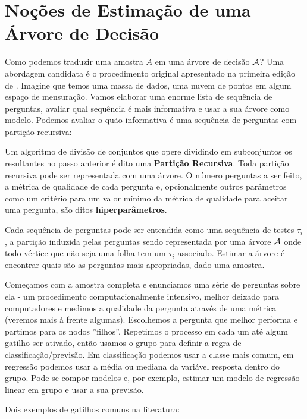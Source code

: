 \section{Noções de Estimação de uma Árvore de Decisão}

Como podemos traduzir uma amostra $A$ em uma árvore de decisão $\mathcal{A}$? Uma abordagem candidata é o procedimento original apresentado na primeira edição de . Imagine que temos uma massa de dados, uma nuvem de pontos em algum espaço de mensuração. Vamos elaborar uma enorme lista de sequência de perguntas, avaliar qual sequência é mais informativa e usar a sua árvore como modelo. Podemos avaliar o quão informativa é uma sequência de perguntas com partição recursiva:

\begin{defi}
Um algoritmo de divisão de conjuntos que opere dividindo em subconjuntos os resultantes no passo anterior é dito uma \textbf{Partição Recursiva}. Toda partição recursiva pode ser representada com uma árvore. O número perguntas a ser feito, a métrica de qualidade de cada pergunta e, opcionalmente outros parâmetros como um critério para um valor mínimo da métrica de qualidade para aceitar uma pergunta, são ditos \textbf{hiperparâmetros}.
\end{defi}

Cada sequência de perguntas pode ser entendida como uma sequência de testes $\tau_i$, a partição induzida pelas perguntas sendo representada por uma árvore $\mathcal{A}$ onde todo vértice que não seja uma folha tem um $\tau_i$ associado. Estimar a árvore é encontrar quais são as perguntas mais apropriadas, dado uma amostra. 

Começamos com a amostra completa e enunciamos uma série de perguntas sobre ela - um procedimento computacionalmente intensivo, melhor deixado para computadores e medimos a qualidade da pergunta através de uma métrica (veremos mais à frente algumas). Escolhemos a pergunta que melhor performa e partimos para os nodos ''filhos''. Repetimos o processo em cada um até algum gatilho ser ativado, então usamos o grupo para definir a regra de classificação/previsão. Em classificação podemos usar a classe mais comum, em regressão podemos usar a média ou mediana da variável resposta dentro do grupo. Pode-se compor modelos e, por exemplo, estimar um modelo de regressão linear em grupo e usar a sua previsão.  

Dois exemplos de gatilhos comuns na literatura:


